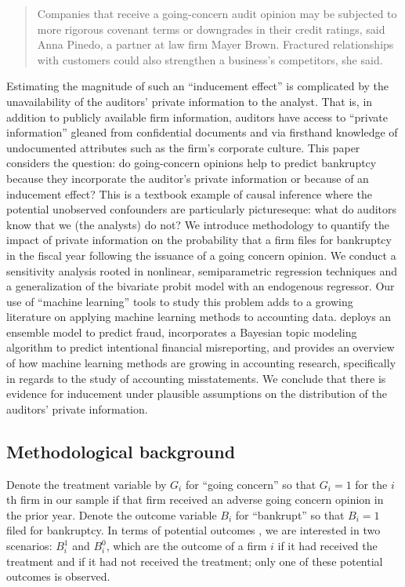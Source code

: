 \documentclass[aoas,preprint, 11pt, dvipsnames, table, x11name]{imsart}
\theoremstyle{remark}
\begin{document}
	\begin{quote}
		Companies that receive a going-concern audit opinion may be subjected to more rigorous covenant terms or downgrades in their credit ratings, said Anna Pinedo, a partner at law firm Mayer Brown. Fractured relationships with customers could also strengthen a business’s competitors, she said.
	\end{quote}
	
	Estimating the magnitude of such an ``inducement effect'' is complicated by the unavailability of the auditors' private information to the analyst. That is, in addition to publicly available firm information, auditors have access to ``private information'' gleaned from confidential documents and via firsthand knowledge of undocumented attributes such as the firm's corporate culture. This paper considers the question: do going-concern opinions help to predict bankruptcy because they incorporate the auditor's private information or because of an inducement effect? This is a textbook example of causal inference where the potential unobserved confounders are particularly pictureseque: what do auditors know that we (the analysts) do not? We introduce methodology to quantify the impact of private information on the probability that a firm files for bankruptcy in the fiscal year following the issuance of a going concern opinion.  We conduct a sensitivity analysis rooted in nonlinear, semiparametric regression techniques and a generalization of the bivariate probit model with an endogenous regressor. Our use of ``machine learning'' tools to study this problem adds to a growing literature on applying machine learning methods to accounting data.  \cite{bao2020detecting} deploys an ensemble model to predict fraud, \cite{brown2020you} incorporates a Bayesian topic modeling algorithm to predict intentional financial misreporting, and  \cite{bertomeu2021using} provides an overview of how machine learning methods are growing in accounting research, specifically in regards to the study of accounting misstatements. We conclude that there is evidence for inducement under plausible assumptions on the distribution of the auditors' private information.
	
	
	\subsection{Methodological background}
	
	Denote the treatment variable by $G_i$ for ``going concern'' so that $G_i = 1$ for the $i$th firm in our sample if that firm received an adverse going concern opinion in the prior year. Denote the outcome variable $B_i$ for ``bankrupt'' so that $B_i = 1$ filed for bankruptcy.
	In terms of potential outcomes \citep{rubin}, we are interested in two scenarios: $B^1_i$ and $B^0_i$, which are the outcome of a firm $i$ if it had received the treatment and if it had not received the treatment; only one of these potential outcomes is observed. 
	
\end{document}
